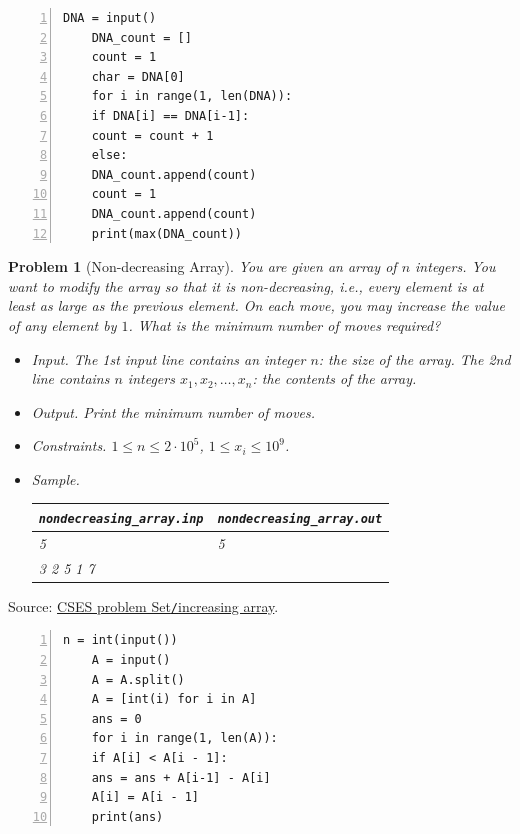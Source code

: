 \documentclass{article}
\newtheorem{problem}{Problem}
\begin{document}
\begin{Verbatim}[numbers=left,xleftmargin=5mm]
	DNA = input()
	DNA_count = []
	count = 1
	char = DNA[0]
	for i in range(1, len(DNA)):
	if DNA[i] == DNA[i-1]:
	count = count + 1
	else:
	DNA_count.append(count)
	count = 1
	DNA_count.append(count)
	print(max(DNA_count))
\end{Verbatim}

\begin{problem}[Non-decreasing Array]
	You are given an array of $n$ integers. You want to modify the array so that it is non-decreasing, i.e., every element is at least as large as the previous element. On each move, you may increase the value of any element by $1$. What is the minimum number of moves required?
	\begin{itemize}
		\item {\sf Input.} The 1st input line contains an integer $n$: the size of the array. The 2nd line contains $n$ integers $x_1,x_2,\ldots,x_n$: the contents of the array.
		\item {\sf Output.} Print the minimum number of moves.
		\item {\sf Constraints.} $1\le n\le2\cdot10^5$, $1\le x_i\le10^9$.
		\item {\sf Sample.}
		\begin{table}[H]
			\centering
			\begin{tabular}{|l|l|}
				\hline
				\verb|nondecreasing_array.inp| & \verb|nondecreasing_array.out| \\
				\hline
				5 & 5 \\
				3 2 5 1 7 & \\
				\hline
			\end{tabular}
		\end{table}
	\end{itemize}
\end{problem}
Source: \href{https://cses.fi/problemset/task/1094}{CSES problem Set{\tt/}increasing array}.

\begin{Verbatim}[numbers=left,xleftmargin=5mm]
	n = int(input())
	A = input()
	A = A.split()
	A = [int(i) for i in A]
	ans = 0
	for i in range(1, len(A)):
	if A[i] < A[i - 1]:
	ans = ans + A[i-1] - A[i]
	A[i] = A[i - 1]
	print(ans)
\end{Verbatim}
\end{document}
